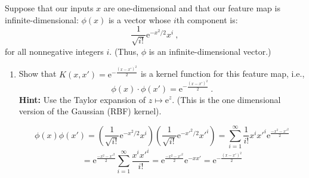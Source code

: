 \documentclass{article}
\providecommand*{\eu}{\ensuremath{\mathrm{e}}}
\begin{document}
\begin{aprob}
     Suppose that our inputs $x$ are one-dimensional and that our feature map is infinite-dimensional: 
    $\phi( x) $ is a vector whose $i$th component is:
    $$\frac{1}{\sqrt{i!}} \eu^{-x^2/2}x^i\ ,$$
    for all nonnegative integers $i$. (Thus, $\phi$ is an infinite-dimensional vector.)
    \begin{enumerate}
        \item Show that $K(x, x') = \eu^{-\frac{(x-x')^2}{2}}$ is a kernel function for this feature map, i.e., 
        $$\phi (x) \cdot \phi (x') = \eu^{-\frac{(x-x')^2}{2}}\ .$$
        \textbf{Hint:} Use the Taylor expansion of $z \mapsto \eu^z$.
        (This is the one dimensional version of the Gaussian  (RBF) kernel).
        
    \begin{equation*}
    \phi( x) \phi( x') =  \left( \frac{1}{\sqrt{i!}} \eu^{-x^2/2}x^i \right)  \left( \frac{1}{\sqrt{i!}} \eu^{-x'^2/2}x'^i \right) = \sum_{i=1}^\infty \frac{1}{i!} x^i x'^i \eu^{\frac{-x^2 - x'^2}{2}}
    \end{equation*}
    \begin{equation*}
    = \eu^{\frac{-x^2 - x'^2}{2}} \sum_{i=1}^\infty \frac{x^i x'^i}{i!} = \eu^{\frac{-x^2 - x'^2}{2}} \eu^{-x x'} = \eu^{-\frac{(x-x')^2}{2}}
    \end{equation*}

    \end{enumerate}
\end{aprob}
\end{document}
